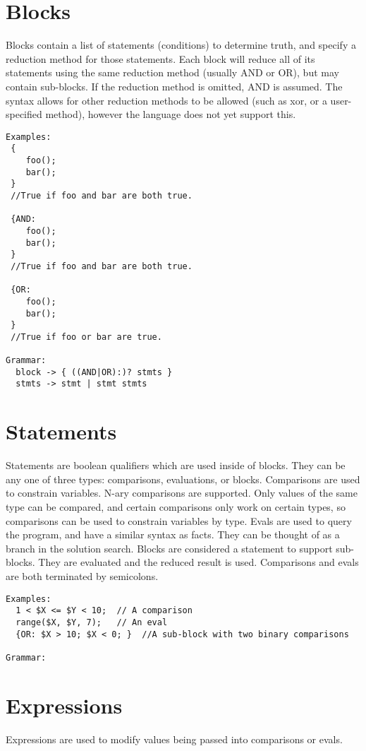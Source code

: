 \documentclass[onecolumn,titlepage]{article}
\begin{document}
\section{Blocks}
Blocks contain a list of statements (conditions) to determine truth, and specify a reduction 
method for those statements.  Each block will reduce all of its statements using the same
reduction method (usually AND or OR), but may contain sub-blocks.  If the reduction method
is omitted, AND is assumed.  The syntax allows for other reduction methods to be allowed
(such as xor, or a user-specified method), however the language does not yet support this.
\begin{verbatim}
Examples:
 { 
    foo();
    bar();
 }
 //True if foo and bar are both true.

 {AND:
    foo();
    bar();
 }
 //True if foo and bar are both true.

 {OR:
    foo();
    bar();
 }
 //True if foo or bar are true.

Grammar:
  block -> { ((AND|OR):)? stmts }
  stmts -> stmt | stmt stmts
\end{verbatim}

\section{Statements}
Statements are boolean qualifiers which are used inside of blocks.  They can be any one
of three types: comparisons, evaluations, or blocks. Comparisons are used to constrain variables.
N-ary comparisons are supported.  Only values of the same type can be compared, and certain
comparisons only work on certain types, so comparisons can be used to constrain variables by 
type.  Evals are used to query the program, and have a similar syntax as facts.  They can be thought
of as a branch in the solution search.  Blocks are considered a statement to support sub-blocks.
They are evaluated and the reduced result is used.  Comparisons and evals are both terminated
by semicolons.

\begin{verbatim}
Examples:
  1 < $X <= $Y < 10;  // A comparison
  range($X, $Y, 7);   // An eval
  {OR: $X > 10; $X < 0; }  //A sub-block with two binary comparisons

Grammar:
\end{verbatim}

\section{Expressions}
Expressions are used to modify values being passed into comparisons or evals.
\end{document}
